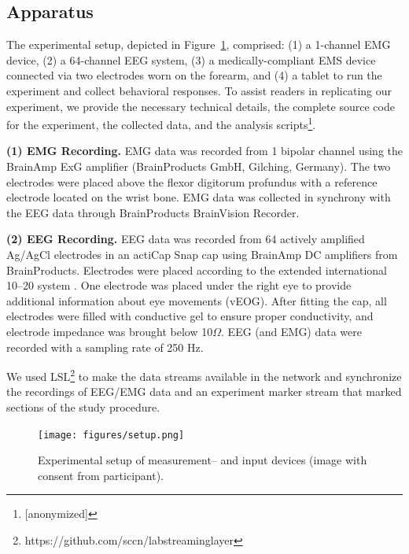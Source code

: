 \subsection{Apparatus}
The experimental setup, depicted in Figure~\ref{fig:setup}, comprised: (1) a 1-channel EMG device, (2) a 64-channel EEG system, (3) a medically-compliant EMS device connected via two electrodes worn on the forearm, and (4) a tablet to run the experiment and collect behavioral responses. To assist readers in replicating our experiment, we provide the necessary technical details, the complete source code for the experiment, the collected data, and the analysis scripts\footnote{[anonymized]}.

\indent\textbf{(1) EMG Recording.} EMG data was recorded from 1 bipolar channel using the BrainAmp ExG amplifier (BrainProducts GmbH, Gilching, Germany). The two electrodes were placed above the flexor digitorum profundus with a reference electrode located on the wrist bone. EMG data was collected in synchrony with the EEG data through BrainProducts BrainVision Recorder.

\indent\textbf{(2) EEG Recording.} EEG data was recorded from 64 actively amplified Ag/AgCl electrodes in an actiCap Snap cap using BrainAmp DC amplifiers from BrainProducts. Electrodes were placed according to the extended international 10–20 system \cite{Jasper1983-uw}. One electrode was placed under the right eye to provide additional information about eye movements (vEOG). After fitting the cap, all electrodes were filled with conductive gel to ensure proper conductivity, and electrode impedance was brought below 10$\Omega$. EEG (and EMG) data were recorded with a sampling rate of 250 Hz. 

We used LSL\footnote{https://github.com/sccn/labstreaminglayer} to make the data streams available in the network and synchronize the recordings of EEG/EMG data and an experiment marker stream that marked sections of the study procedure.

\begin{figure}[!h]
    \centering
    \texttt{[image: figures/setup.png]}
    \label{fig:setup}
    \caption{Experimental setup of measurement-- and input devices (image with consent from participant).}
\end{figure}

